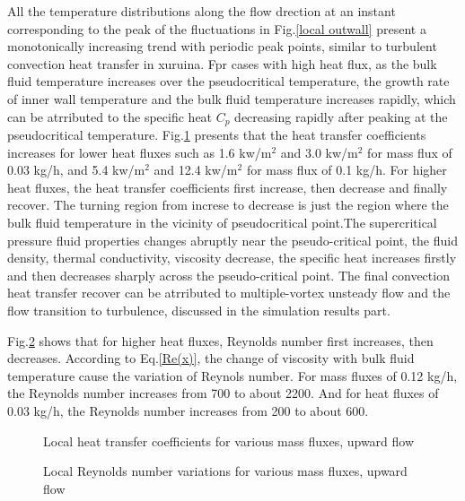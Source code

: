 \documentclass[a4paper,12pt]{article}
\begin{document}
All the temperature distributions along the flow drection at an instant corresponding to the peak of the fluctuations in Fig.\ref{local outwall} present a monotonically increasing trend with periodic peak points, similar to turbulent convection heat transfer in {xuruina}. Fpr cases with high heat flux, as the bulk fluid temperature increases over the pseudocritical temperature, the growth rate of inner wall temperature and the bulk fluid temperature increases rapidly, which can be atrributed to the specific heat $C_p$  decreasing rapidly after peaking at the pseudocritical temperature. Fig.\ref{Local heat} presents that the heat transfer coefficients increases for lower heat fluxes such as 1.6 kw/m$^2$ and 3.0 kw/m$^2$ for mass flux of 0.03 kg/h, and 5.4 kw/m$^2$ and 12.4 kw/m$^2$ for mass flux of 0.1 kg/h. For higher heat fluxes, the heat transfer coefficients first increase, then decrease and finally recover. The turning region from increse to decrease is just the region where the bulk fluid temperature in the vicinity of pseudocritical point.The supercritical pressure fluid properties changes abruptly near the pseudo-critical point, the fluid density, thermal conductivity, viscosity decrease, the specific heat increases firstly and then decreases sharply across the pseudo-critical point. The final convection heat transfer recover can be atrributed to multiple-vortex unsteady flow and the  flow transition to turbulence, discussed in the simulation results part. 

Fig.\ref{Local Reynolds} shows that for higher heat fluxes, Reynolds number first increases, then decreases. According to Eq.\eqref{Re(x)}, the change of viscosity with bulk fluid temperature cause the variation of Reynols number. For mass fluxes of 0.12 kg/h, the Reynolds number increases from 700 to about 2200. And for heat fluxes of 0.03 kg/h, the Reynolds number increases from 200 to about 600.

\begin{figure}
	\centering
	\caption{Local heat transfer coefficients for various mass fluxes, upward flow}\label{Local heat}
\end{figure}
	
\begin{figure}
	\centering
	\caption{Local Reynolds number variations for various mass fluxes, upward flow}\label{Local Reynolds}
\end{figure}
\end{document}
